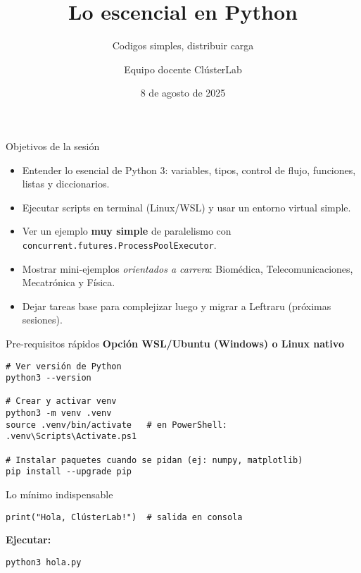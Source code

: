 \documentclass[aspectratio=169,professionalfonts]{beamer}
\title[ClústerLab • Día 3]{Lo escencial en Python}
\subtitle{Codigos simples, distribuir carga}
\author{Equipo docente ClústerLab}
\date{8 de agosto de 2025}
\begin{document}
\begin{frame}[plain]
  \titlepage
\end{frame}

\begin{frame}{Objetivos de la sesión}
\begin{itemize}
  \item Entender lo esencial de Python 3: variables, tipos, control de flujo, funciones, listas y diccionarios.
  \item Ejecutar scripts en terminal (Linux/WSL) y usar un entorno virtual simple.
  \item Ver un ejemplo \textbf{muy simple} de paralelismo con \texttt{concurrent.futures.ProcessPoolExecutor}.
  \item Mostrar mini-ejemplos \emph{orientados a carrera}: Biomédica, Telecomunicaciones, Mecatrónica y Física.
  \item Dejar tareas base para complejizar luego y migrar a Leftraru (próximas sesiones).
\end{itemize}
\end{frame}

\begin{frame}[fragile]{Pre-requisitos rápidos}
\textbf{Opción WSL/Ubuntu (Windows) o Linux nativo}
\begin{verbatim}
# Ver versión de Python
python3 --version

# Crear y activar venv
python3 -m venv .venv
source .venv/bin/activate   # en PowerShell:  .venv\Scripts\Activate.ps1

# Instalar paquetes cuando se pidan (ej: numpy, matplotlib)
pip install --upgrade pip
\end{verbatim}
\end{frame}

\begin{frame}[fragile]{Lo mínimo indispensable}
\begin{verbatim}
print("Hola, ClústerLab!")  # salida en consola
\end{verbatim}

\textbf{Ejecutar:}
\begin{verbatim}
python3 hola.py
\end{verbatim}
\end{frame}
\end{document}
